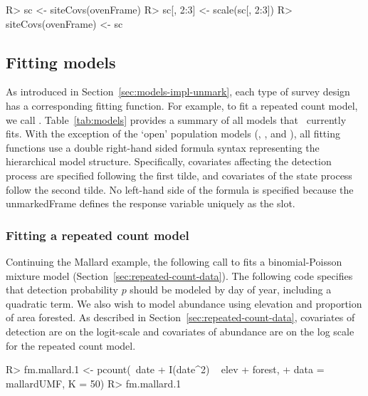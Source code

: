\documentclass[article,shortnames]{jss}
\newcommand{\um}{\pkg{unmarked}}
\begin{document}
{\begin{Schunk}
\begin{Sinput}
R> sc <- siteCovs(ovenFrame)
R> sc[, 2:3] <- scale(sc[, 2:3])
R> siteCovs(ovenFrame) <- sc
\end{Sinput}
\end{Schunk}



\subsection{Fitting models}
\label{sec:fitting-models}

As introduced in Section~\ref{sec:models-impl-unmark}, each type of
survey design
has a corresponding fitting function.  For example, to fit a repeated count
model, we call .  Table~\ref{tab:models} provides a
summary of all models that \um\ currently fits.  With the exception of the
`open' population models (, , and
), all fitting functions use a double right-hand sided
formula syntax representing the hierarchical model structure.
Specifically, covariates affecting the detection process are specified
following the first tilde, and covariates of the state process follow the
second tilde. No left-hand side of the formula is specified because the
unmarkedFrame defines the response variable uniquely as the  slot.

\subsubsection{Fitting a repeated count model}

Continuing the Mallard example, the following call to  fits a
binomial-Poisson mixture model (Section~\ref{sec:repeated-count-data}).  The
following code specifies that detection probability $p$ should be modeled by
day of year, including a quadratic term.  We also wish to model abundance
using elevation and proportion of area forested.  As described in
Section~\ref{sec:repeated-count-data}, covariates of detection are on the
logit-scale and covariates of abundance are on the log scale for the
repeated count model.

\begin{Schunk}
\begin{Sinput}
R> fm.mallard.1 <- pcount(~date + I(date^2) ~ elev + forest, 
+     data = mallardUMF, K = 50)
R> fm.mallard.1
\end{Sinput}
\end{Schunk}

}
\end{document}
